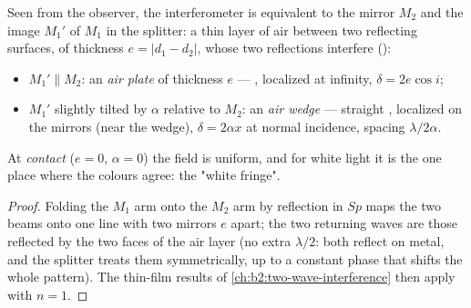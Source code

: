 \begin{proposition}\label{prop:b2:michelson:equivalent}
Seen from the observer, the interferometer is equivalent to the mirror
$M_2$ and the image $M_1'$ of $M_1$ in the splitter: a thin layer of air
between two reflecting surfaces, of thickness $e = |d_1 - d_2|$, whose
two reflections interfere ():
\begin{itemize}
  \item $M_1' \parallel M_2$: an \emph{air plate} of thickness $e$ --- , localized at infinity, $\delta = 2e\cos i$;
  \item $M_1'$ slightly tilted by $\alpha$ relative to $M_2$: an \emph{air wedge}
        --- straight , localized on the
        mirrors (near the wedge), $\delta = 2\alpha x$ at normal incidence,
        spacing $\lambda/2\alpha$.
\end{itemize}
At \emph{contact} ($e = 0$, $\alpha = 0$) the field is uniform, and for white
light it is the one place where the colours agree: the "white fringe".
\end{proposition}

\begin{proof}
Folding the $M_1$ arm onto the $M_2$ arm by reflection in $Sp$ maps the
two beams onto one line with two mirrors $e$ apart; the two returning
waves are those reflected by the two faces of the air layer (no extra
$\lambda/2$: both reflect on metal, and the splitter treats them
symmetrically, up to a constant phase that shifts the whole pattern).
The thin-film results of \cref{ch:b2:two-wave-interference} then apply
with $n = 1$.
\end{proof}

